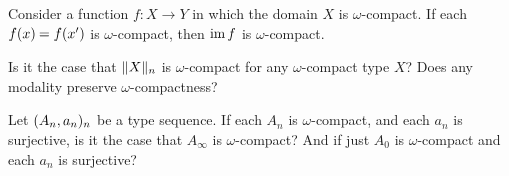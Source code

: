 \begin{conj}
Consider a function $f:X\to Y$ in which the domain $X$ is $\omega$-compact. If
each $\id{f(x)}{f(x')}$ is $\omega$-compact, then $\im{f}$ is $\omega$-compact.
\end{conj}

\begin{conj}
Is it the case that $\trunc{n}{X}$ is $\omega$-compact for any $\omega$-compact
type $X$? Does any modality preserve $\omega$-compactness?
\end{conj}

\begin{conj}
Let $\sequence{A}{a}$ be a type sequence. If each $A_n$ is $\omega$-compact, and
each $a_n$ is surjective, is it the case that $A_\infty$ is $\omega$-compact? And
if just $A_0$ is $\omega$-compact and each $a_n$ is surjective?
\end{conj}

\begin{comment}
\begin{conj}
Suppose $X$ and $Y$ are $\omega$-compact. Then $X=Y$ is $\omega$-compact.
\end{conj}

\begin{proof}[Non-proof]
Consider the infinite sequence
\begin{equation*}
\begin{tikzcd}
A_0 \arrow[r] & A_1 \arrow[r] & A_2 \arrow[r] & \cdots
\end{tikzcd}
\end{equation*}
Since $\isequiv(f)$ is a mere proposition (and hence $\omega$-compact) for
any $f:X\to Y$, we have
\begin{align*}
(X=Y)\to A_\infty 
& \eqvsym
(\eqv{X}{Y})\to A_\infty \\
& \eqvsym 
(\sm{f:X\to Y}\isequiv(f))\to A_\infty \\
& \eqvsym
\prd{f:X\to Y} \isequiv(f)\to A_\infty \\
& \eqvsym
\prd{f:X\to Y} \tfcolim_n(\isequiv(f)\to A_n)
\end{align*}
This reduction is not going to help, because $X\to Y$ does not need to be
$\omega$-compact.
\end{proof}

\begin{conj}
If $X$ is $\omega$-compact, then so is $\mathrm{Aut}(X)$.
\end{conj}

\begin{proof}

\end{proof}
\end{comment}

